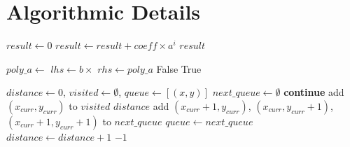 \documentclass[12pt, reqno]{amsart}
\theoremstyle{definition}
\theoremstyle{remark}
\numberwithin{equation}{section}
\begin{document}
\section{Algorithmic Details}
\vspace{-5cm}
\label{appendix:A}
\begin{algorithm}[h]
\caption{Search for Lattice Point with Specified Visibility Radius}

\begin{algorithmic}[1]

    \State $result \gets 0$
        \State $result \gets result + coeff \times a^i$
    \EndFor
    \State \Return $result$
\EndFunction

    \State $poly\_a \gets$ 
        \State $lhs \gets b \times$ 
        \State $rhs \gets poly\_a$
            \State \Return False
        \EndIf
    \EndFor
    \State \Return True
\EndFunction

    \State $distance \gets 0$, $visited \gets \emptyset$, $queue \gets [(x, y)]$
        \State $next\_queue \gets \emptyset$
                \State \textbf{continue}
            \EndIf
            \State add $(x_{curr}, y_{curr})$ to $visited$
                \State \Return $distance$
            \EndIf
            \State add $(x_{curr}+1, y_{curr})$, $(x_{curr}, y_{curr}+1)$, $(x_{curr}+1, y_{curr}+1)$ to $next\_queue$
        \EndFor
        \State $queue \gets next\_queue$
        \State $distance \gets distance + 1$
    \EndWhile
    \State \Return $-1$
\EndFunction
{}
\end{algorithmic}
\end{algorithm}
\end{document}
